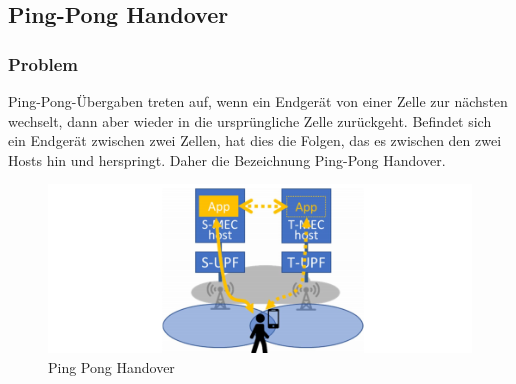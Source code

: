 \documentclass[runningheads]{llncs}
\numberwithin{figure}{section}
\begin{document}
\subsection{Ping-Pong Handover}
\subsubsection{Problem}
Ping-Pong-Übergaben treten auf, wenn ein Endgerät von einer Zelle zur nächsten wechselt, dann aber wieder in die ursprüngliche 
Zelle zurückgeht. Befindet sich ein Endgerät zwischen zwei Zellen, hat dies die Folgen, das es zwischen den zwei Hosts
hin und herspringt. Daher die Bezeichnung Ping-Pong Handover.
\begin{figure}
  \includegraphics[width=\linewidth]{images/pingpong.png}
  \caption{Ping Pong Handover}
  \label{fig:pingpong}
\end{figure}
\end{document}
